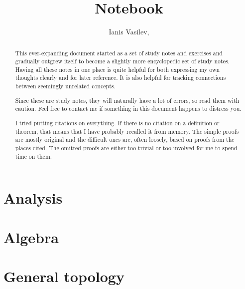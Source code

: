 \documentclass[bibliography=totocnumbered]{scrartcl}
\title{Notebook}
\subtitle{\URL{https://github.com/v--/notebook}}
\author{Ianis Vasilev, \Email{ianis@ivasilev.net}}
\date{}
\begin{document}
\hfuzz=3pt
\maketitle

\begin{abstract}
  This ever-expanding document started as a set of study notes and exercises and gradually outgrew itself to become a slightly more encyclopedic set of study notes. Having all these notes in one place is quite helpful for both expressing my own thoughts clearly and for later reference. It is also helpful for tracking connections between seemingly unrelated concepts.

  Since these are study notes, they will naturally have a lot of errors, so read them with caution. Feel free to contact me if something in this document happens to distress you.

  I tried putting citations on everything. If there is no citation on a definition or theorem, that means that I have probably recalled it from memory. The simple proofs are mostly original and the difficult ones are, often loosely, based on proofs from the places cited. The omitted proofs are either too trivial or too involved for me to spend time on them.
\end{abstract}

\newpage
\tableofcontents
\newpage

\section{Analysis}\label{sec:analysis}











\section{Algebra}\label{sec:algebra}






\section{General topology}\label{sec:general_topology}







\end{document}
